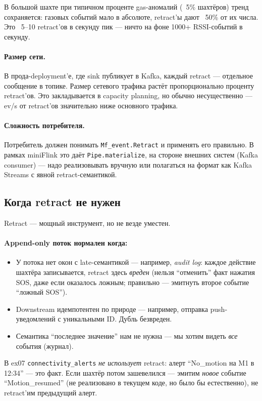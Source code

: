 В большой шахте при типичном проценте gas-аномалий (~5\% шахтёров)
тренд сохраняется: газовых событий мало в абсолюте, retract'ы дают
~50\% от их числа. Это ~5--10 retract'ов в секунду пик --- ничто на
фоне 1000+ RSSI-событий в секунду.

\paragraph{Размер сети.} В прода-deployment'е, где sink публикует в
Kafka, каждый retract --- отдельное сообщение в топике. Размер
сетевого трафика растёт пропорционально проценту retract'ов. Это
закладывается в capacity planning, но обычно несущественно --- ev/s
от retract'ов значительно ниже основного трафика.

\paragraph{Сложность потребителя.} Потребитель должен понимать
\texttt{Mf\_event.Retract} и применять его правильно. В рамках
miniFlink это даёт \texttt{Pipe.materialize}, на стороне внешних
систем (Kafka consumer) --- надо реализовывать вручную или
полагаться на формат как Kafka Streams с явной retract-семантикой.

\subsection{Когда retract не нужен}

Retract --- мощный инструмент, но не везде уместен.

\paragraph{Append-only поток нормален когда:}
\begin{itemize}
\item У потока нет окон с late-семантикой --- например,
\emph{audit log}: каждое действие шахтёра записывается, retract
здесь \emph{вреден} (нельзя ``отменить'' факт нажатия SOS, даже если
оказалось ложным; правильно --- эмитнуть второе событие
``ложный SOS'').
\item Downstream идемпотентен по природе --- например, отправка
push-уведомлений с уникальными ID. Дубль безвреден.
\item Семантика ``последнее значение'' нам не нужна --- мы хотим
видеть \emph{все} события (журнал).
\end{itemize}

В ex07 \texttt{connectivity\_alerts} \emph{не использует} retract:
алерт ``No\_motion на M1 в 12:34'' --- это факт. Если шахтёр потом
зашевелился --- эмитим \emph{новое} событие ``Motion\_resumed'' (не
реализовано в текущем коде, но было бы естественно), не retract'им
предыдущий алерт.

